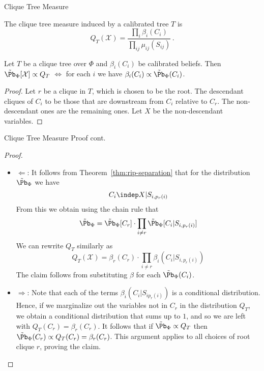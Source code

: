 \begin{frame}{Clique Tree Measure}
    \begin{definition}
       The clique tree measure induced by a calibrated tree $T$ is 
       \begin{equation}
              Q_T(\mathcal{X}) = \frac{\prod_{i} \beta_i(C_i)}{\prod_{ij} \mu_{ij}(S_{ij})}\,.
       \end{equation}
    \end{definition}
    \pause
\begin{theorem}
\label{thm:calibrated-clique-tree-Q}
Let $T$ be a clique tree over $\Phi$ and $\beta_i(C_i)$ be calibrated beliefs. 
Then $\tilde{\Pb}_{\Phi}[\mathcal{X}] \propto Q_T$ $\Leftrightarrow$ for each $i$ we have $\beta_i(C_i) \propto \tilde{\Pb}_{\Phi}(C_i)$.
\end{theorem}
\pause
\begin{proof}
Let $r$ be a clique in $T$, which is chosen to be the root.
The descendant cliques of $C_i$ to be those that are downstream from $C_i$ relative to $C_r$. The non-descendant ones are the remaining ones.
Let $X$ be the non-descendant variables.
\end{proof}
\end{frame}
\begin{frame}{Clique Tree Measure Proof cont.}
\begin{proof}
\begin{itemize} \item $\Leftarrow$:
    \pause
It follows from Theorem~\ref{thm:rip-separation} that for the distribution $\tilde{\Pb}_{\Phi}$ we have
\begin{equation}
    C_i \indep X | S_{i,p_r(i)}
\end{equation}
From this we obtain using the chain rule that 
\begin{equation}
    \tilde{\Pb}_{\Phi} = \tilde{\Pb}_{\Phi}[C_r] \cdot \prod_{i \neq r} \tilde{\Pb}_{\Phi}[C_i | S_{i,p_r(i)}]
\end{equation}
We can rewrite $Q_T$ similarly as 
\begin{equation}
    Q_T(\mathcal{X}) = \beta_r(C_r) \cdot \prod_{i \neq r} \beta_i(C_i | S_{i,p_r(i)})
\end{equation}
The claim follows from substituting $\beta$ for each $\tilde{\Pb}_{\Phi}(C_i)$.
\pause \item $\Rightarrow$: \pause
Note that each of the terms $\beta_i(C_i | S_{i p_r(i)})$ is a conditional distribution.
Hence, if we marginalize out the variables not in $C_r$ in the distribution $Q_T$, we obtain a conditional distribution that sums up to $1$, and so we are left with $Q_T(C_r) = \beta_r(C_r)$.
\pause
It follows that if $\tilde{\Pb}_{\Phi} \propto Q_T$ then $\tilde{\Pb}_{\Phi}(C_r) \propto Q_T(C_r) = \beta_r(C_r)$.
\pause
This argument applies to all choices of root clique $r$, proving the claim.
\end{itemize}
\end{proof}
\end{frame}
